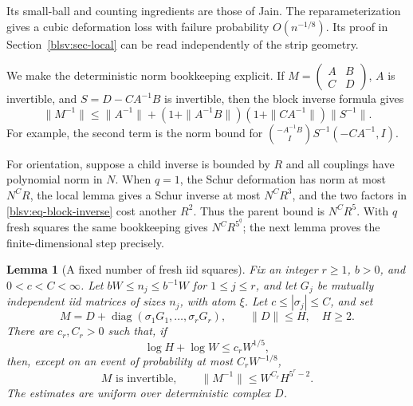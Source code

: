 \documentclass[11pt,reqno]{amsart}
\numberwithin{equation}{section}
\theoremstyle{plain}
\newtheorem{lemma}[theorem]{Lemma}
\theoremstyle{definition}
\theoremstyle{remark}
\begin{document}
Its small-ball and counting ingredients are those of Jain. The
reparameterization gives a cubic deformation loss with failure
probability $O(n^{-1/8})$. Its proof in Section~\ref{blsv:sec-local}
can be read independently of the strip geometry.


We make the deterministic norm bookkeeping explicit. If
$M=\left(\begin{smallmatrix}A&B\\ C&D\end{smallmatrix}\right)$,
$A$ is invertible, and $S=D-CA^{-1}B$ is invertible, then the block inverse
formula gives
\begin{equation}\label{blsv:eq-block-inverse}
 \|M^{-1}\|\le \|A^{-1}\|+
 (1+\|A^{-1}B\|)(1+\|CA^{-1}\|)\|S^{-1}\|.
\end{equation}
For example, the second term is the norm bound for
$\binom{-A^{-1}B}{I}S^{-1}(-CA^{-1},I)$.

For orientation, suppose a child inverse is bounded by $R$ and all
couplings have polynomial norm in $N$. When $q=1$, the Schur deformation
has norm at most $N^C R$, the local lemma gives a Schur inverse at most
$N^C R^3$, and the two factors in \eqref{blsv:eq-block-inverse} cost
another $R^2$. Thus the parent bound is $N^C R^5$. With $q$ fresh
squares the same bookkeeping gives $N^C R^{5^q}$; the next lemma proves
the finite-dimensional step precisely.

\begin{lemma}[A fixed number of fresh iid squares]\label{blsv:lem-finite}
Fix an integer $r\ge1$, $b>0$, and $0<c<C<\infty$. Let
$bW\le n_j\le b^{-1}W$ for $1\le j\le r$, and let $G_j$ be mutually
independent iid matrices of sizes $n_j$, with atom $\xi$. Let
$c\le|\sigma_j|\le C$, and set
\[
 M=D+\operatorname{diag}(\sigma_1G_1,\ldots,\sigma_rG_r),
 \qquad \|D\|\le H,\quad H\ge2.
\]
There are $c_r,C_r>0$ such that, if
\begin{equation}\label{blsv:eq-finite-cap}
 \log H+\log W\le c_r W^{1/5},
\end{equation}
then, except on an event of probability at most $C_rW^{-1/8}$,
\begin{equation}\label{blsv:eq-finite-inverse}
 M\text{ is invertible},\qquad
 \|M^{-1}\|\le W^{C_r}H^{5^r-2}.
\end{equation}
The estimates are uniform over deterministic complex $D$.
\end{lemma}
\end{document}
